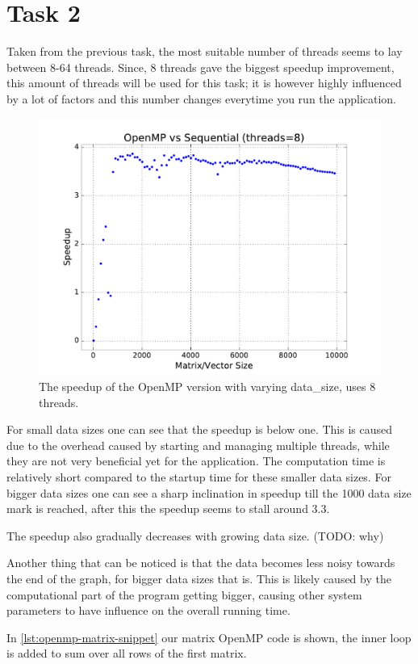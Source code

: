 \documentclass[final]{report}
\begin{document}
\section{Task 2}
Taken from the previous task, the most suitable number of threads seems to lay between 8-64 threads.
Since, 8 threads gave the biggest speedup improvement, this amount of threads will be used for this task; it is however highly influenced by a lot of factors and this number changes everytime you run the application.

\begin{figure}[H]
\centering
    \includegraphics[width=\linewidth]{resources/openmp-data-size-sweep.pdf}
    \caption{The speedup of the OpenMP version with varying data\_size, uses 8 threads.}
    \label{fig:openmp-data-size-sweep}
\end{figure}

For small data sizes one can see that the speedup is below one.
This is caused due to the overhead caused by starting and managing multiple threads, while they are not very beneficial yet for the application.
The computation time is relatively short compared to the startup time for these smaller data sizes. For bigger data sizes one can see a sharp inclination in speedup till the 1000 data size mark is reached, after this the speedup seems to stall around 3.3.

The speedup also gradually decreases with growing data size.
(TODO: why)

Another thing that can be noticed is that the data becomes less noisy towards the end of the graph, for bigger data sizes that is.
This is likely caused by the computational part of the program getting bigger, causing other system parameters to have influence on the overall running time.

In \cref{lst:openmp-matrix-snippet} our matrix OpenMP code is shown, the inner loop is added to sum over all rows of the first matrix.
\end{document}

